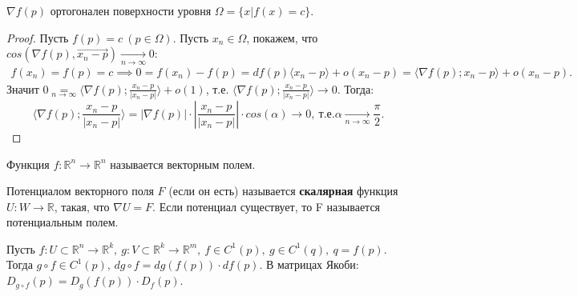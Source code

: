 \begin{statement}
    $\nabla f(p)$ ортогонален поверхности уровня $\Omega = \{x | f(x) = c\}$.
    \begin{proof}
        Пусть $f(p) = c \ (p \in \Omega)$. Пусть $x_n \in \Omega$, покажем, что $cos(\nabla f(p), \overrightarrow{x_n-p}) \underset{n \to \infty}{\to} 0:$
        \begin{eqnarray*}
            f(x_n) = f(p) = c \implies 0 = f(x_n) - f(p) = df(p)\langle x_n-p \rangle + o(x_n - p) = 
            \langle \nabla f(p); x_n - p \rangle + o(x_n - p).
        \end{eqnarray*}
        Значит $0 \underset{n \to \infty}{=} \langle \nabla f(p); \frac{x_n - p}{|x_n - p|} \rangle + o(1)$, т.е.
        $\langle \nabla f(p); \frac{x_n - p}{|x_n - p|} \rangle \to 0 $. Тогда:
        \begin{equation*}
            \langle \nabla f(p); \frac{x_n - p}{|x_n - p|} \rangle = |\nabla f(p)|\cdot \left|\frac{x_n-p}{|x_n-p|}\right|\cdot cos(\alpha) \to 0, 
            \ \text{т.е.} \alpha \underset{n \to \infty}{\to} \frac{\pi}{2}. 
        \end{equation*}
        
    \end{proof}
\end{statement}

\begin{definition}
    Функция $f:\mathbb{R}^n \to \mathbb{R}^n$ называется векторным полем.
\end{definition}
\begin{definition}
    Потенциалом векторного поля $F$ (если он есть) называется \textbf{скалярная} функция $U:W \to \mathbb{R}$, 
    такая, что $\nabla U = F$. Если потенциал существует, то F называется потенциальным полем.

\end{definition}

\begin{theorem*}
    Пусть $f:U \subset \mathbb{R}^n \to \mathbb{R}^k, \ g:V \subset \mathbb{R}^k \to \mathbb{R}^m, \ f \in C^1(p), \ g \in C^1(q), \ q = f(p)$.\\
    Тогда $g \circ f \in C^1(p), \, dg \circ f = dg(f(p)) \cdot df(p).$ В матрицах Якоби: $D_{g \circ f}(p) = D_g(f(p)) \cdot D_f(p).$
\end{theorem*}

